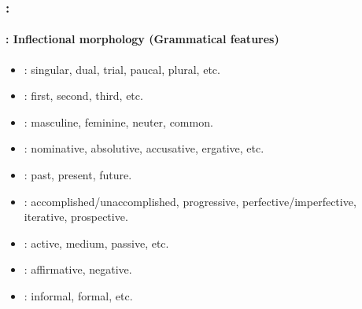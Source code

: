 \documentclass[xcolor=table]{beamer}
\begin{document}
\begin{frame}
	\frametitle{\insertshortsubtitle: \insertsection}
	\framesubtitle{\insertsubsection: Inflectional morphology (Grammatical features)}

	\begin{itemize}
		\item {}: singular, dual, trial, paucal, plural, etc. 
		\item {}: first, second, third, etc.
		\item {}: masculine, feminine, neuter, common.
		\item {}: nominative, absolutive, accusative, ergative, etc.
		\item {}: past, present, future.
		\item {}: accomplished/unaccomplished, progressive, perfective/imperfective, iterative, prospective.
		\item {}: active, medium, passive, etc.
		\item {}: affirmative, negative.
		\item {}: informal, formal, etc.
	\end{itemize}

\end{frame}
\end{document}
